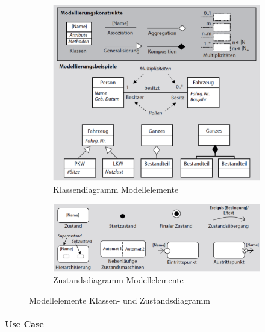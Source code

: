 \documentclass[a4paper]{article}
\begin{document}
			\begin{figure}[!htb]
				\centering
				\begin{subfigure}{.45\textwidth}
					\centering
					\includegraphics[width=\textwidth]{img/re/03/class_elements.png}
					\caption{Klassendiagramm Modellelemente}
					\label{fig:re_class_elements}
				\end{subfigure}
				\begin{subfigure}{.45\textwidth}
					\centering
					\includegraphics[width=\textwidth]{img/re/03/state_elements.png}
					\caption{Zustandsdiagramm Modellelemente}
					\label{fig:re_state_elements}
				\end{subfigure}
				\caption{Modellelemente Klassen- und Zustandsdiagramm}
				\label{fig:re_elements_02}
			\end{figure}

				\paragraph{Use Case}
		
\end{document}
